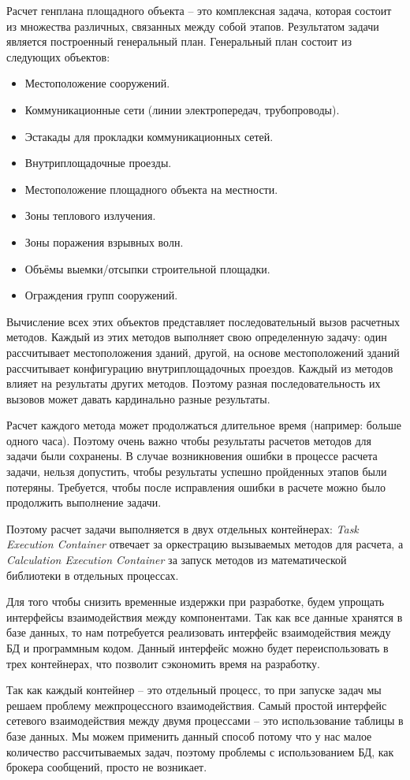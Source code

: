 Расчет генплана площадного объекта -- это комплексная задача, которая состоит из множества различных,
связанных между собой этапов. Результатом задачи является построенный генеральный план.
Генеральный план состоит из следующих объектов:
\begin{itemize}
	\item Местоположение сооружений.
	\item Коммуникационные сети (линии электропередач, трубопроводы).
	\item Эстакады для прокладки коммуникационных сетей.
	\item Внутриплощадочные проезды.
	\item Местоположение площадного объекта на местности.
	\item Зоны теплового излучения.
	\item Зоны поражения взрывных волн.
	\item Объёмы выемки/отсыпки строительной площадки.
	\item Ограждения групп сооружений.
\end{itemize}

Вычисление всех этих объектов представляет последовательный вызов расчетных методов.
Каждый из этих методов выполняет свою определенную задачу: один рассчитывает местоположения зданий, другой, на основе
местоположений зданий рассчитывает конфигурацию внутриплощадочных проездов. Каждый из методов влияет на
результаты других методов. Поэтому разная последовательность их вызовов может давать кардинально разные результаты.

Расчет каждого метода может продолжаться длительное время (например: больше одного часа). Поэтому очень важно
чтобы результаты расчетов методов для задачи были сохранены. В случае возникновения ошибки в процессе расчета задачи,
нельзя допустить, чтобы результаты успешно пройденных этапов были потеряны. Требуется, чтобы после исправления ошибки
в расчете можно было продолжить выполнение задачи.

Поэтому расчет задачи выполняется в двух отдельных контейнерах: \textit{Task Execution Container} отвечает за оркестрацию
вызываемых методов для расчета, а \textit{Calculation Execution Container} за запуск методов из математической библиотеки
в отдельных процессах.

Для того чтобы снизить временные издержки при разработке, будем упрощать интерфейсы взаимодействия между компонентами.
Так как все данные хранятся в базе данных, то нам потребуется реализовать интерфейс взаимодействия между БД
и программным кодом. Данный интерфейс можно будет переиспользовать в трех контейнерах, что позволит сэкономить время на
разработку.

Так как каждый контейнер -- это отдельный процесс, то при запуске задач мы решаем проблему межпроцессного взаимодействия.
Самый простой интерфейс сетевого взаимодействия между двумя процессами -- это использование таблицы в базе данных.
Мы можем применить данный способ потому что у нас малое количество рассчитываемых задач, поэтому проблемы
с использованием БД, как брокера сообщений, просто не возникает.
